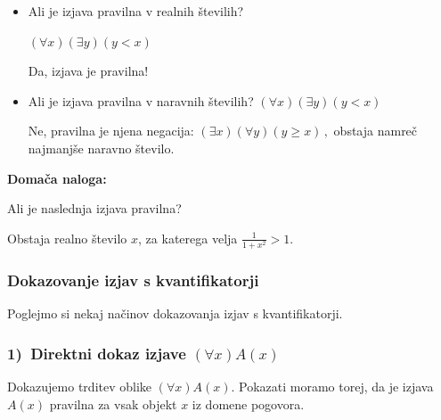 \documentclass[11pt,paper=b5,footinclude,headinclude]{scrbook} %
\newcounter{example}
\def\cee {{~\Leftrightarrow~}}
\begin{document}
\begin{itemize}
  \item Ali je izjava pravilna v realnih številih?

  $(\forall x)(\exists y)(y<x)$

  Da, izjava je pravilna!

  \item Ali je izjava pravilna v naravnih številih?
  $(\forall x)(\exists y)(y<x)$

Ne, pravilna je njena negacija:
$(\exists x)(\forall y)(y\ge x)\,,$
obstaja namreč najmanjše naravno število.
\end{itemize}

\textbf{ Domača naloga:}

Ali je naslednja izjava pravilna?

Obstaja realno število $x$, za katerega velja $\frac{1}{1+x^2}>1$.

%
%
%
%
%
%
%


\subsubsection{Dokazovanje izjav s kvantifikatorji}

Poglejmo si nekaj načinov dokazovanja izjav s kvantifikatorji.

\subsubsection*{1)~Direktni dokaz izjave $(\forall x)A(x)$}

Dokazujemo trditev oblike $(\forall x)A(x)$.  Pokazati moramo torej, da je izjava $A(x)$
pravilna za vsak objekt $x$ iz domene pogovora.
\end{document}
